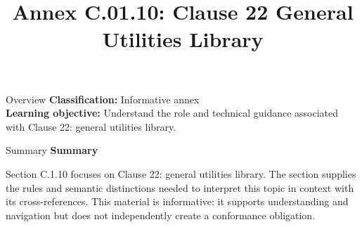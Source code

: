 \documentclass[10pt,letterpaper]{article}
\title{Annex C.01.10: Clause 22 General Utilities Library}
\author{}
\date{}
\begin{document}
\maketitle
\begin{CornellOverviewBox}{Overview}
\textbf{Classification:} Informative annex\\[2pt]
\textbf{Learning objective:} Understand the role and technical guidance associated with Clause 22: general utilities library.
\end{CornellOverviewBox}\begin{CornellSummaryBox}{Summary}
{\sffamily\bfseries\color{Accent} Summary}\par\vspace{3pt}Section C.1.10 focuses on Clause 22: general utilities library. The section supplies the rules and semantic distinctions needed to interpret this topic in context with its cross-references. This material is informative: it supports understanding and navigation but does not independently create a conformance obligation.
\end{CornellSummaryBox}
\end{document}
